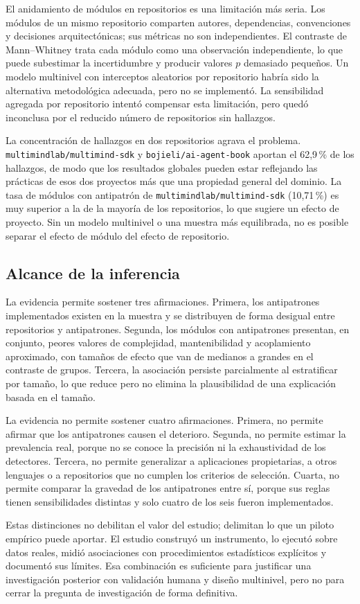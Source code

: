 El anidamiento de módulos en repositorios es una limitación más seria. Los módulos de un mismo repositorio comparten autores, dependencias, convenciones y decisiones arquitectónicas; sus métricas no son independientes. El contraste de Mann--Whitney trata cada módulo como una observación independiente, lo que puede subestimar la incertidumbre y producir valores $p$ demasiado pequeños. Un modelo multinivel con interceptos aleatorios por repositorio habría sido la alternativa metodológica adecuada, pero no se implementó. La sensibilidad agregada por repositorio intentó compensar esta limitación, pero quedó inconclusa por el reducido número de repositorios sin hallazgos.

La concentración de hallazgos en dos repositorios agrava el problema. \texttt{multimindlab/multimind-sdk} y \texttt{bojieli/ai-agent-book} aportan el 62,9\,\% de los hallazgos, de modo que los resultados globales pueden estar reflejando las prácticas de esos dos proyectos más que una propiedad general del dominio. La tasa de módulos con antipatrón de \texttt{multimindlab/multimind-sdk} (10,71\,\%) es muy superior a la de la mayoría de los repositorios, lo que sugiere un efecto de proyecto. Sin un modelo multinivel o una muestra más equilibrada, no es posible separar el efecto de módulo del efecto de repositorio.

\subsection{Alcance de la inferencia}

La evidencia permite sostener tres afirmaciones. Primera, los antipatrones implementados existen en la muestra y se distribuyen de forma desigual entre repositorios y antipatrones. Segunda, los módulos con antipatrones presentan, en conjunto, peores valores de complejidad, mantenibilidad y acoplamiento aproximado, con tamaños de efecto que van de medianos a grandes en el contraste de grupos. Tercera, la asociación persiste parcialmente al estratificar por tamaño, lo que reduce pero no elimina la plausibilidad de una explicación basada en el tamaño.

La evidencia no permite sostener cuatro afirmaciones. Primera, no permite afirmar que los antipatrones causen el deterioro. Segunda, no permite estimar la prevalencia real, porque no se conoce la precisión ni la exhaustividad de los detectores. Tercera, no permite generalizar a aplicaciones propietarias, a otros lenguajes o a repositorios que no cumplen los criterios de selección. Cuarta, no permite comparar la gravedad de los antipatrones entre sí, porque sus reglas tienen sensibilidades distintas y solo cuatro de los seis fueron implementados.

Estas distinciones no debilitan el valor del estudio; delimitan lo que un piloto empírico puede aportar. El estudio construyó un instrumento, lo ejecutó sobre datos reales, midió asociaciones con procedimientos estadísticos explícitos y documentó sus límites. Esa combinación es suficiente para justificar una investigación posterior con validación humana y diseño multinivel, pero no para cerrar la pregunta de investigación de forma definitiva.
